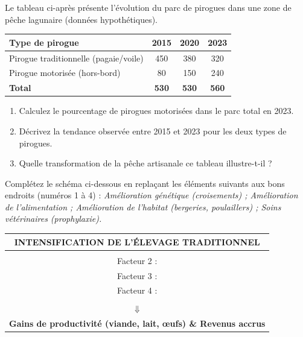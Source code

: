 \documentclass[11pt]{article}
\begin{document}
\begin{exercice}
Le tableau ci-après présente l'évolution du parc de pirogues dans une zone de pêche lagunaire (données hypothétiques).
\begin{center}
\begin{tabular}{|l|c|c|c|}
\hline
\textbf{Type de pirogue} & \textbf{2015} & \textbf{2020} & \textbf{2023} \\
\hline
Pirogue traditionnelle (pagaie/voile) & 450 & 380 & 320 \\
\hline
Pirogue motorisée (hors-bord) & 80 & 150 & 240 \\
\hline
\textbf{Total} & \textbf{530} & \textbf{530} & \textbf{560} \\
\hline
\end{tabular}
\end{center}
\begin{enumerate}
    \item Calculez le pourcentage de pirogues motorisées dans le parc total en 2023.
    \item Décrivez la tendance observée entre 2015 et 2023 pour les deux types de pirogues.
    \item Quelle transformation de la pêche artisanale ce tableau illustre-t-il ?
\end{enumerate}
\end{exercice}

\begin{exercice}
Complétez le schéma ci-dessous en replaçant les éléments suivants aux bons endroits (numéros 1 à 4) :
\textit{Amélioration génétique (croisements) ; Amélioration de l'alimentation ; Amélioration de l'habitat (bergeries, poulaillers) ; Soins vétérinaires (prophylaxie).}
\begin{center}
\begin{tabular}{|c|}
\hline
\textbf{INTENSIFICATION DE L'ÉLEVAGE TRADITIONNEL} \\
\hline
\begin{minipage}{0.8\linewidth}
\centering
Facteur 1 : \underline{\hspace{5cm}} \\
Facteur 2 : \underline{\hspace{5cm}} \\
Facteur 3 : \underline{\hspace{5cm}} \\
Facteur 4 : \underline{\hspace{5cm}} \\
\end{minipage} \\
\hline
$\Downarrow$ \\
\hline
\textbf{Gains de productivité (viande, lait, œufs) \& Revenus accrus} \\
\hline
\end{tabular}
\end{center}
\end{exercice}
\end{document}
